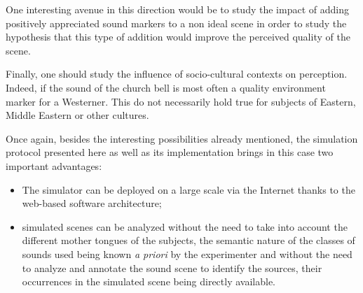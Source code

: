 \documentclass[12pt]{elsarticle}
\begin{document}
One interesting avenue in this direction would be to study the impact of adding positively appreciated sound markers to a non ideal scene in order to study the hypothesis that this type of addition would improve the perceived quality of the scene.


Finally, one should study the influence of socio-cultural contexts on perception. Indeed, if the sound of the church bell is most often a quality environment marker for a Westerner. This do not necessarily hold true for subjects of Eastern, Middle Eastern or other cultures.


Once again, besides the interesting possibilities already mentioned, the simulation protocol presented here as well as its implementation brings in this case two important advantages:


\begin{itemize}
\item The simulator can be deployed on a large scale via the Internet thanks to the web-based software architecture;
\item simulated scenes can be analyzed without the need to take into account the different mother tongues of the subjects, the semantic nature of the classes of sounds used being known \emph{a priori} by the experimenter and without the need to analyze and annotate the sound scene to identify the sources, their occurrences in the simulated scene being directly available.
\end{itemize}
\end{document}
